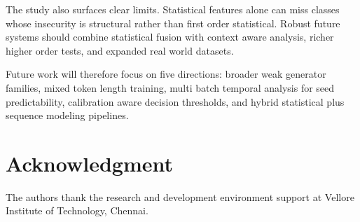 \documentclass[conference]{IEEEtran}
\begin{document}
The study also surfaces clear limits. Statistical features alone can miss classes whose insecurity is structural rather than first order statistical. Robust future systems should combine statistical fusion with context aware analysis, richer higher order tests, and expanded real world datasets.

Future work will therefore focus on five directions: broader weak generator families, mixed token length training, multi batch temporal analysis for seed predictability, calibration aware decision thresholds, and hybrid statistical plus sequence modeling pipelines.

\section*{Acknowledgment}
The authors thank the research and development environment support at Vellore Institute of Technology, Chennai.
\end{document}
